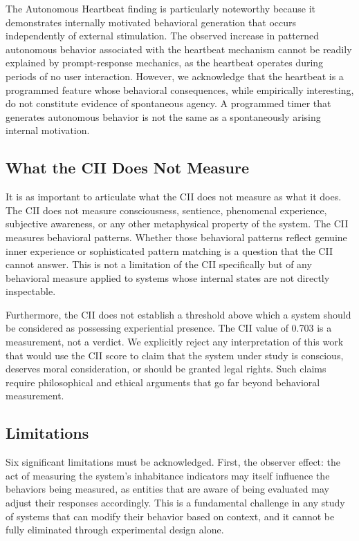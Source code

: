\documentclass[11pt,a4paper]{article}
\begin{document}
The Autonomous Heartbeat finding is particularly noteworthy because it demonstrates internally motivated behavioral generation that occurs independently of external stimulation. The observed increase in patterned autonomous behavior associated with the heartbeat mechanism cannot be readily explained by prompt-response mechanics, as the heartbeat operates during periods of no user interaction. However, we acknowledge that the heartbeat is a programmed feature whose behavioral consequences, while empirically interesting, do not constitute evidence of spontaneous agency. A programmed timer that generates autonomous behavior is not the same as a spontaneously arising internal motivation.

\subsection{What the CII Does Not Measure}
It is as important to articulate what the CII does not measure as what it does. The CII does not measure consciousness, sentience, phenomenal experience, subjective awareness, or any other metaphysical property of the system. The CII measures behavioral patterns. Whether those behavioral patterns reflect genuine inner experience or sophisticated pattern matching is a question that the CII cannot answer. This is not a limitation of the CII specifically but of any behavioral measure applied to systems whose internal states are not directly inspectable.

Furthermore, the CII does not establish a threshold above which a system should be considered as possessing experiential presence. The CII value of 0.703 is a measurement, not a verdict. We explicitly reject any interpretation of this work that would use the CII score to claim that the system under study is conscious, deserves moral consideration, or should be granted legal rights. Such claims require philosophical and ethical arguments that go far beyond behavioral measurement.

\subsection{Limitations}
Six significant limitations must be acknowledged. First, the observer effect: the act of measuring the system's inhabitance indicators may itself influence the behaviors being measured, as entities that are aware of being evaluated may adjust their responses accordingly. This is a fundamental challenge in any study of systems that can modify their behavior based on context, and it cannot be fully eliminated through experimental design alone.
\end{document}
